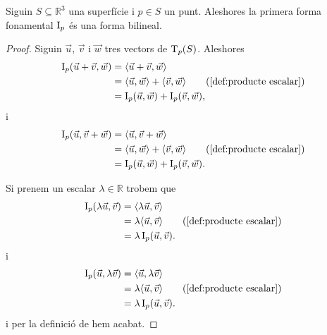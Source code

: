 \documentclass[../../Main.tex]{subfiles}
\begin{document}
	\begin{proposition}
		\label{prop:la primera forma fonamental és una forma bilineal}
		Siguin \(S\subseteq\mathbb{R}^{3}\) una superfície i \(p\in S\) un punt. Aleshores la primera forma fonamental \(\I_{p}\) és una forma bilineal.
		\begin{proof}
			Siguin \(\vec{u}\), \(\vec{v}\) i \(\vec{w}\) tres vectors de \(\operatorname{T}_{p}(S)\). Aleshores
			\begin{align*}
				\I_{p}(\vec{u}+\vec{v},\vec{w})&=\prodesc{\vec{u}+\vec{v}}{\vec{w}} \\
				&=\prodesc{\vec{u}}{\vec{w}}+\prodesc{\vec{v}}{\vec{w}} \tag{\ref{def:producte escalar}}\\
				&=\I_{p}(\vec{u},\vec{w})+\I_{p}(\vec{v},\vec{w}),
			\end{align*}
			i
			\begin{align*}
				\I_{p}(\vec{u},\vec{v}+\vec{w})&=\prodesc{\vec{u}}{\vec{v}+\vec{w}} \\
				&=\prodesc{\vec{u}}{\vec{w}}+\prodesc{\vec{v}}{\vec{w}} \tag{\ref{def:producte escalar}}\\
				&=\I_{p}(\vec{u},\vec{w})+\I_{p}(\vec{v},\vec{w}).
			\end{align*}
			
			Si prenem un escalar \(\lambda\in\mathbb{R}\) trobem que
			\begin{align*}
				\I_{p}(\lambda\vec{u},\vec{v})&=\prodesc{\lambda\vec{u}}{\vec{v}} \\
				&=\lambda\prodesc{\vec{u}}{\vec{v}} \tag{\ref{def:producte escalar}}\\
				&=\lambda\I_{p}(\vec{u},\vec{v}).
			\end{align*}
			i
			\begin{align*}
				\I_{p}(\vec{u},\lambda\vec{v})&=\prodesc{\vec{u}}{\lambda\vec{v}} \\
				&=\lambda\prodesc{\vec{u}}{\vec{v}} \tag{\ref{def:producte escalar}}\\
				&=\lambda\I_{p}(\vec{u},\vec{v}).
			\end{align*}
			i per la definició de  hem acabat.
		\end{proof}
	\end{proposition}
\end{document}
